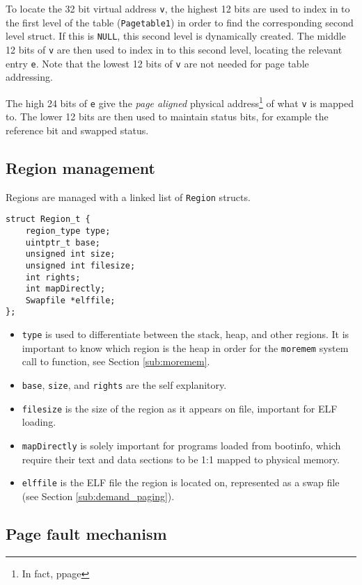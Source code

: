 \documentclass[12pt,english]{article}
\begin{document}
To locate the 32 bit virtual address \texttt{v}, the highest 12 bits are used to index in to the first level of the table (\texttt{Pagetable1}) in order to find the corresponding second level struct.  If this is \texttt{NULL}, this second level is dynamically created.  The middle 12 bits of \texttt{v} are then used to index in to this second level, locating the relevant entry \texttt{e}.  Note that the lowest 12 bits of \texttt{v} are not needed for page table addressing.

The high 24 bits of \texttt{e} give the \emph{page aligned} physical address\footnote{In fact, ppage} of what \texttt{v} is mapped to.  The lower 12 bits are then used to maintain status bits, for example the reference bit and swapped status.

\subsection{Region management}

Regions are managed with a linked list of \texttt{Region} structs.

\begin{verbatim}
struct Region_t {
    region_type type;
    uintptr_t base;
    unsigned int size;
    unsigned int filesize;
    int rights;
    int mapDirectly;
    Swapfile *elffile;
};
\end{verbatim}

\begin{itemize}
\item \texttt{type} is used to differentiate between the stack, heap, and other regions.  It is important to know which region is the heap in order for the \texttt{moremem} system call to function, see Section \ref{sub:moremem}.
\item \texttt{base}, \texttt{size}, and \texttt{rights} are the self explanitory.
\item \texttt{filesize} is the size of the region as it appears on file, important for ELF loading.
\item \texttt{mapDirectly} is solely important for programs loaded from bootinfo, which require their text and data sections to be 1:1 mapped to physical memory.
\item \texttt{elffile} is the ELF file the region is located on, represented as a swap file (see Section \ref{sub:demand_paging}).
\end{itemize}

\subsection{Page fault mechanism}
\end{document}
